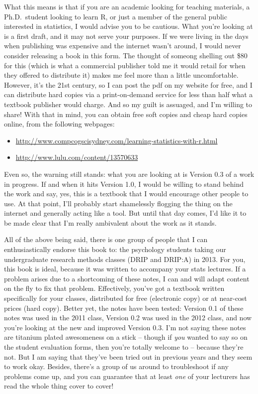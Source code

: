 \documentclass[
]{book}
\providecommand{\tightlist}{%
  \setlength{\itemsep}{0pt}\setlength{\parskip}{0pt}}
\begin{document}
What this means is that if you are an academic looking for teaching materials, a Ph.D.~student looking to learn R, or just a member of the general public interested in statistics, I would advise you to be cautious. What you're looking at is a first draft, and it may not serve your purposes. If we were living in the days when publishing was expensive and the internet wasn't around, I would never consider releasing a book in this form. The thought of someong shelling out \$80 for this (which is what a commercial publisher told me it would retail for when they offered to distribute it) makes me feel more than a little uncomfortable. However, it's the 21st century, so I can post the pdf on my website for free, and I can distribute hard copies via a print-on-demand service for less than half what a textbook publisher would charge. And so my guilt is assuaged, and I'm willing to share! With that in mind, you can obtain free soft copies and cheap hard copies online, from the following webpages:

\begin{itemize}
\tightlist
\item
  \url{http://www.compcogscisydney.com/learning-statistics-with-r.html}
\item
  \url{http://www.lulu.com/content/13570633}
\end{itemize}

Even so, the warning still stands: what you are looking at is Version 0.3 of a work in progress. If and when it hits Version 1.0, I would be willing to stand behind the work and say, yes, this is a textbook that I would encourage other people to use. At that point, I'll probably start shamelessly flogging the thing on the internet and generally acting like a tool. But until that day comes, I'd like it to be made clear that I'm really ambivalent about the work as it stands.

All of the above being said, there is one group of people that I can enthusiastically endorse this book to: the psychology students taking our undergraduate research methods classes (DRIP and DRIP:A) in 2013. For you, this book is ideal, because it was written to accompany your stats lectures. If a problem arises due to a shortcoming of these notes, I can and will adapt content on the fly to fix that problem. Effectively, you've got a textbook written specifically for your classes, distributed for free (electronic copy) or at near-cost prices (hard copy). Better yet, the notes have been tested: Version 0.1 of these notes was used in the 2011 class, Version 0.2 was used in the 2012 class, and now you're looking at the new and improved Version 0.3. I'm not saying these notes are titanium plated awesomeness on a stick -- though if \emph{you} wanted to say so on the student evaluation forms, then you're totally welcome to -- because they're not. But I am saying that they've been tried out in previous years and they seem to work okay. Besides, there's a group of us around to troubleshoot if any problems come up, and you can guarantee that at least \emph{one} of your lecturers has read the whole thing cover to cover!
\end{document}
